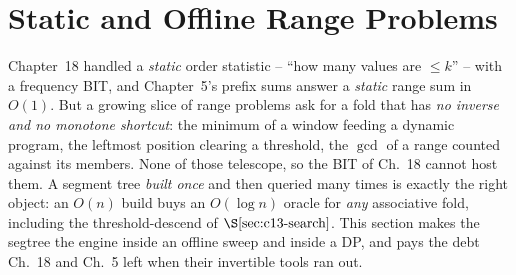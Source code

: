 \section{Static and Offline Range Problems}\label{sec:c13-static}

\begin{previouslybox}
Chapter~18 handled a \emph{static} order statistic -- ``how many values are
\(\le k\)'' -- with a frequency BIT, and Chapter~5's prefix sums answer a
\emph{static} range sum in \(O(1)\).  But a growing slice of range problems ask
for a fold that has \emph{no inverse and no monotone shortcut}: the minimum of a
window feeding a dynamic program, the leftmost position clearing a threshold,
the \(\gcd\) of a range counted against its members.  None of those telescope, so
the BIT of Ch.~18 cannot host them.  A segment tree \emph{built once} and then
queried many times is exactly the right object: an \(O(n)\) build buys an
\(O(\log n)\) oracle for \emph{any} associative fold, including the
threshold-descend of \(\secref{c13-search}\).  This section makes the segtree the
engine inside an offline sweep and inside a DP, and pays the debt Ch.~18 and
Ch.~5 left when their invertible tools ran out.
\end{previouslybox}

